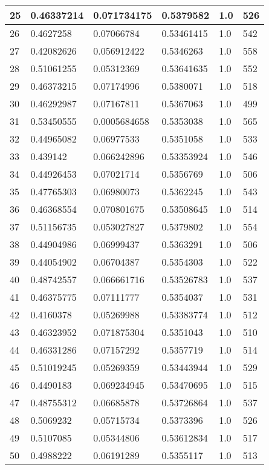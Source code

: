 \begin{longtable}{|l|l|l|l|l|l|}
25 & 0.46337214 & 0.071734175 & 0.5379582 & 1.0 & 526 \\ \hline 
26 & 0.4627258 & 0.07066784 & 0.53461415 & 1.0 & 542 \\ \hline 
27 & 0.42082626 & 0.056912422 & 0.5346263 & 1.0 & 558 \\ \hline 
28 & 0.51061255 & 0.05312369 & 0.53641635 & 1.0 & 552 \\ \hline 
29 & 0.46373215 & 0.07174996 & 0.5380071 & 1.0 & 518 \\ \hline 
30 & 0.46292987 & 0.07167811 & 0.5367063 & 1.0 & 499 \\ \hline 
31 & 0.53450555 & 0.0005684658 & 0.5353038 & 1.0 & 565 \\ \hline 
32 & 0.44965082 & 0.06977533 & 0.5351058 & 1.0 & 533 \\ \hline 
33 & 0.439142 & 0.066242896 & 0.53353924 & 1.0 & 546 \\ \hline 
34 & 0.44926453 & 0.07021714 & 0.5356769 & 1.0 & 506 \\ \hline 
35 & 0.47765303 & 0.06980073 & 0.5362245 & 1.0 & 543 \\ \hline 
36 & 0.46368554 & 0.070801675 & 0.53508645 & 1.0 & 514 \\ \hline 
37 & 0.51156735 & 0.053027827 & 0.5379802 & 1.0 & 554 \\ \hline 
38 & 0.44904986 & 0.06999437 & 0.5363291 & 1.0 & 506 \\ \hline 
39 & 0.44054902 & 0.06704387 & 0.5354303 & 1.0 & 522 \\ \hline 
40 & 0.48742557 & 0.066661716 & 0.53526783 & 1.0 & 537 \\ \hline 
41 & 0.46375775 & 0.07111777 & 0.5354037 & 1.0 & 531 \\ \hline 
42 & 0.4160378 & 0.05269988 & 0.53383774 & 1.0 & 512 \\ \hline 
43 & 0.46323952 & 0.071875304 & 0.5351043 & 1.0 & 510 \\ \hline 
44 & 0.46331286 & 0.07157292 & 0.5357719 & 1.0 & 514 \\ \hline 
45 & 0.51019245 & 0.05269359 & 0.53443944 & 1.0 & 529 \\ \hline 
46 & 0.4490183 & 0.069234945 & 0.53470695 & 1.0 & 515 \\ \hline 
47 & 0.48755312 & 0.06685878 & 0.53726864 & 1.0 & 537 \\ \hline 
48 & 0.5069232 & 0.05715734 & 0.5373396 & 1.0 & 526 \\ \hline 
49 & 0.5107085 & 0.05344806 & 0.53612834 & 1.0 & 517 \\ \hline 
50 & 0.4988222 & 0.06191289 & 0.5355117 & 1.0 & 513 \\ \hline 
\end{longtable}
